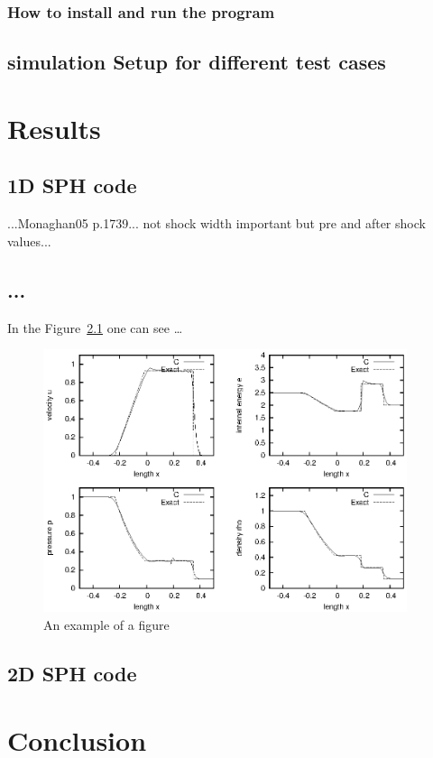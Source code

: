 \documentclass{report}
\begin{document}


\subsection{How to install and run the program}
\label{sec:HowToInstAndRun2D}


\section{simulation Setup for different test cases}
\label{sec:simuSetupTestCases}



\chapter{Results}
\section{1D SPH code}
...Monaghan05 p.1739... not shock width important but pre and after shock values...

\section{...}
\label{sec:results}

In the Figure~\ref{fig:1dshock} one can see \ldots

\begin{figure}[h]
  \centering
  \includegraphics[width=0.95\textwidth]{img/1dshock.eps}
  \caption{An example of a figure}
  \label{fig:1dshock}
\end{figure}

\section{2D SPH code}



\chapter{Conclusion}
\label{sec:conclusion}

\listoffigures



\end{document}
